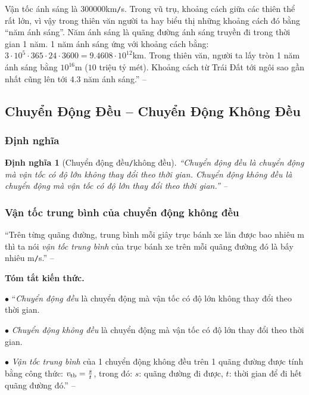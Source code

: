 \documentclass{article}
\numberwithin{equation}{section}
\newtheorem{dinhnghia}{Định nghĩa}[section]
\begin{document}
Vận tốc ánh sáng là $300000$km\texttt{/}s. Trong vũ trụ, khoảng cách giữa các thiên thể rất lớn, vì vậy trong thiên văn người ta hay biểu thị những khoảng cách đó bằng ``năm ánh sáng''. Năm ánh sáng là quãng đường ánh sáng truyền đi trong thời gian 1 năm. 1 năm ánh sáng ứng với khoảng cách bằng: $3\cdot 10^5\cdot 365\cdot 24\cdot 3600 = 9.4608\cdot 10^{12}$km. Trong thiên văn, người ta lấy tròn 1 năm ánh sáng bằng $10^{16}$m ($10$ triệu tỷ mét). Khoảng cách từ Trái Đất tới ngôi sao gần nhất cũng lên tới $4.3$ năm ánh sáng.'' -- \cite[p. 10]{SGK_Vat_Ly_8}


\subsection{Chuyển Động Đều -- Chuyển Động Không Đều}

\subsubsection{Định nghĩa}

\begin{dinhnghia}[Chuyển động đều\texttt{/}không đều]
	``\emph{Chuyển động đều} là chuyển động mà vận tốc có độ lớn không thay đổi theo thời gian. \emph{Chuyển động không đều} là chuyển động mà vận tốc có độ lớn thay đổi theo thời gian.'' -- \cite[p. 11]{SGK_Vat_Ly_8}
\end{dinhnghia}

\subsubsection{Vận tốc trung bình của chuyển động không đều}
``Trên từng quãng đường, trung bình mỗi giây trục bánh xe lăn được bao nhiêu m thì ta nói \textit{vận tốc trung bình} của trục bánh xe trên mỗi quãng đường đó là bấy nhiêu m\texttt{/}s.'' -- \cite[p. 12]{SGK_Vat_Ly_8}
\vspace{2mm}

\noindent\textbf{Tóm tắt kiến thức.}
\begin{enumerate*}
	\item[$\bullet$] ``\textit{Chuyển động đều} là chuyển động mà vận tốc có độ lớn không thay đổi theo thời gian.
	\item[$\bullet$] \textit{Chuyển động không đều} là chuyển động mà vận tốc có độ lớn thay đổi theo thời gian.
	\item[$\bullet$] \textit{Vận tốc trung bình} của 1 chuyển động không đều trên 1 quãng đường được tính bằng công thức: $v_{\rm tb} = \frac{s}{t}$, trong đó: $s$: quãng đường đi được, $t$: thời gian để đi hết quãng đường đó.'' -- \cite[p. 13]{SGK_Vat_Ly_8}
\end{enumerate*}
\end{document}
